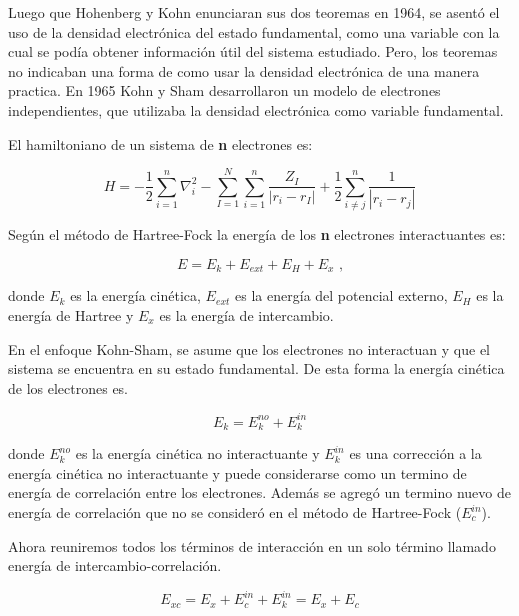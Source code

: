 Luego que Hohenberg y Kohn enunciaran sus dos teoremas en 
1964, se asent\'o 
el uso de la densidad electr\'onica del estado fundamental, como una variable 
con la cual se pod\'ia obtener informaci\'on \'util del sistema estudiado. 
Pero, los teoremas no indicaban una forma de como usar la densidad 
electr\'onica de una manera practica. En 1965 Kohn y Sham desarrollaron un 
modelo de electrones independientes, que utilizaba la densidad electr\'onica 
como variable fundamental.

\noindent El hamiltoniano de un sistema de \textbf{n} electrones es:

\begin{equation}
    H = -\frac{1}{2} \sum _{i=1}^{n} \nabla _{i}^{2} - \sum 
    _{I=1}^{N} \sum _{i=1}^{n} \frac{Z_{I}}{|r_{i} - r_{I}|} + \frac{1}{2} 
    \sum _{i\neq j}^{n} \frac{1}{|r_{i} - r_{j}|}
\end{equation}

\noindent Seg\'un el m\'etodo de Hartree-Fock la energ\'ia de los \textbf{n} 
electrones interactuantes es:

\begin{equation}
    E = E_{k} + E_{ext} + E_{H} + E_{x} \textrm{ ,}
\end{equation}

\noindent donde $E_{k}$ es la energ\'ia cin\'etica, $E_{ext}$ es la energ\'ia 
del potencial externo, $E_{H}$ es la energ\'ia de Hartree y $E_{x}$ es la 
energ\'ia de intercambio.

\noindent En el enfoque Kohn-Sham, se asume que los electrones no interactuan y 
que el sistema se 
encuentra en su estado fundamental. De esta forma la 
energ\'ia cin\'etica de los electrones es.

\begin{equation}
    E_{k} = E_{k}^{no} + E_{k}^{in}
\end{equation}

\noindent donde $E_{k}^{no}$ es la energ\'ia cin\'etica no interactuante y  
$E_{k}^{in}$ es una correcci\'on a la energ\'ia cin\'etica no interactuante y 
puede considerarse como un termino de energ\'ia de correlaci\'on entre los 
electrones.  Adem\'as se agreg\'o un termino nuevo de energ\'ia de 
correlaci\'on 
que no se consider\'o en el m\'etodo de Hartree-Fock ($E_{c}^{in}$).

\noindent  Ahora reuniremos todos los t\'erminos de interacci\'on en un solo 
t\'ermino llamado energ\'ia de intercambio-correlaci\'on.

\begin{equation}
    E_{xc} = E_{x} + E_{c}^{in} + E_{k}^{in} = E_{x} + E_{c}
\end{equation}


